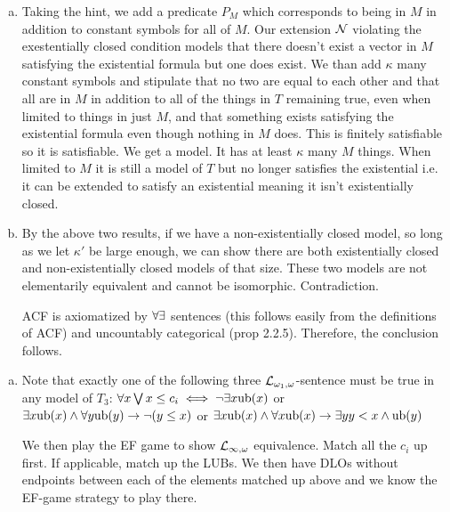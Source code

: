 \begin{enumerate}[1.]
\begin{enumerate}[a)]
  \item Taking the hint, we add a predicate \(P_M\) which corresponds to being in \(M\) in addition to constant symbols for all of \(M\). 
Our extension \(\mathcal{N}\) violating the exestentially closed condition models that there doesn't exist a vector in \(M\) satisfying the existential formula but one does exist. We than add \(\kappa\) many constant symbols and stipulate that no two are equal to each other and that all are in \(M\) in addition to all of the things in \(T\) remaining true, even when limited to things in just \(M\), and that something exists satisfying the existential formula even though nothing in \(M\) does. 
This is finitely satisfiable so it is satisfiable. We get a model. It has at least \(\kappa\) many \(M\) things. 
When limited to \(M\) it is still a model of \(T\) but no longer satisfies the existential i.e. it can be extended to satisfy an existential meaning it isn't existentially closed.   

  \item By the above two results, if we have a non-existentially closed model,  so long as we let \(\kappa'\) be large enough, we can show there are both existentially closed and non-existentially closed models of that size. These two models are not elementarily equivalent and cannot be isomorphic. Contradiction. 

ACF is axiomatized by \(\forall\exists\) sentences (this follows easily from the definitions of ACF) and uncountably categorical (prop 2.2.5). Therefore, the conclusion follows. 

  \end{enumerate}
 
\addtocounter{enumi}{11}

  \begin{enumerate}[a)]

    \item Note that exactly one of the following three \(\mathcal{L}_{\omega_1, \omega}\)-sentence must be true in any model of \(T_3\): 
    \(\forall x \bigvee x \leq c_i \iff \neg\exists x \text{ub}(x)\) or
    \(\exists x \text{ub}(x) \land \forall y \text{ub}(y) \to \neg(y \leq x)\) or
    \(\exists x \text{ub}(x) \land \forall x \text{ub}(x) \to \exists y y < x \land \text{ub}(y)\)

    We then play the EF game to show \(\mathcal{L}_{\infty, \omega}\) equivalence. Match all the \(c_i\) up first. If applicable, match up the LUBs.
    We then have DLOs without endpoints between each of the elements matched up above and we know the EF-game strategy to play there.   
    

\end{enumerate}
\end{enumerate}
